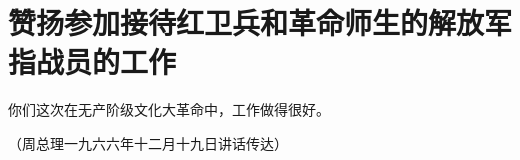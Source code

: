 \section[赞扬参加接待红卫兵和革命师生的解放军指战员的工作（一九六六年十二月）]{赞扬参加接待红卫兵和革命师生的解放军指战员的工作}


你们这次在无产阶级文化大革命中，工作做得很好。

{\raggedleft （周总理一九六六年十二月十九日讲话传达）\par}


